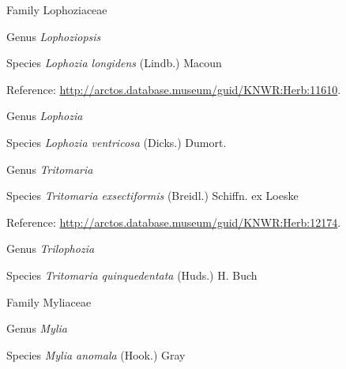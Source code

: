 \documentclass[9pt, article]{memoir}
\begin{document}
\begin{multicols}{2}
\vspace{6pt}\noindent\hspace{24pt}Family Lophoziaceae


\vspace{6pt}\noindent\hspace{30pt}Genus \textit{Lophoziopsis}


\vspace{6pt}\noindent\hspace{36pt}Species \textit{Lophozia longidens} (Lindb.) Macoun


\vspace{6pt}Reference: 
\url{http://arctos.database.museum/guid/KNWR:Herb:11610}.

\vspace{6pt}\noindent\hspace{30pt}Genus \textit{Lophozia}


\vspace{6pt}\noindent\hspace{36pt}Species \textit{Lophozia ventricosa} (Dicks.) Dumort.


\vspace{6pt}\noindent\hspace{30pt}Genus \textit{Tritomaria}


\vspace{6pt}\noindent\hspace{36pt}Species \textit{Tritomaria exsectiformis} (Breidl.) Schiffn. ex Loeske


\vspace{6pt}Reference: 
\url{http://arctos.database.museum/guid/KNWR:Herb:12174}.

\vspace{6pt}\noindent\hspace{30pt}Genus \textit{Trilophozia}


\vspace{6pt}\noindent\hspace{36pt}Species \textit{Tritomaria quinquedentata} (Huds.) H. Buch


\vspace{6pt}\noindent\hspace{24pt}Family Myliaceae


\vspace{6pt}\noindent\hspace{30pt}Genus \textit{Mylia}


\vspace{6pt}\noindent\hspace{36pt}Species \textit{Mylia anomala} (Hook.) Gray



\end{multicols}
\end{document}
